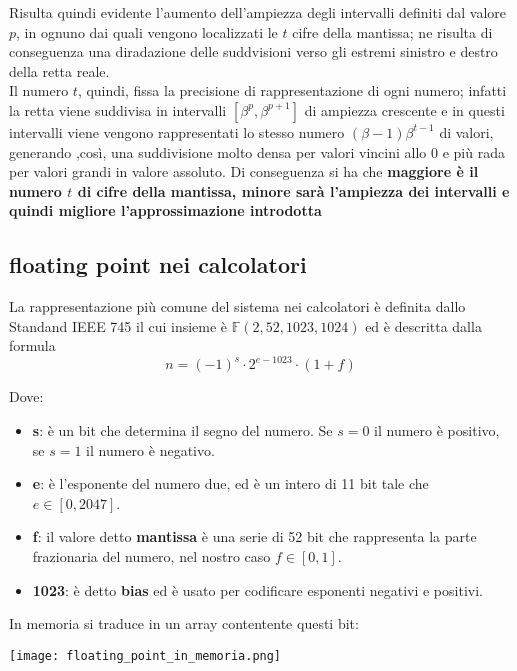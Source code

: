 Risulta quindi evidente l'aumento dell'ampiezza degli intervalli definiti dal valore $p$, in ognuno dai quali vengono localizzati le $t$ cifre della mantissa; ne risulta di conseguenza una diradazione delle suddvisioni verso gli estremi sinistro e destro della retta reale. \\
Il numero $t$, quindi, fissa la precisione di rappresentazione di ogni numero; infatti la retta viene suddivisa in intervalli $[\beta^p,\beta^{p+1}]$  di ampiezza crescente e in questi intervalli viene vengono rappresentati lo stesso numero $(\beta-1)\beta^{t-1}$ di valori, generando ,così, una suddivisione molto densa per valori vincini allo 0 e più rada per valori grandi in valore assoluto. Di conseguenza si ha che \textbf{maggiore è il numero $t$ di cifre della mantissa, minore sarà l'ampiezza dei intervalli e quindi migliore l'approssimazione introdotta}

\subsection{floating point nei calcolatori}
La rappresentazione più comune del sistema nei calcolatori è definita dallo Standand IEEE 745 il cui insieme è $\mathbb{F}(2,52,1023,1024)$ ed è descritta dalla formula
\[
    n = (-1)^s \cdot 2^{e-1023} \cdot (1+f)   
\]

Dove: 
\begin{itemize}
    \item \textbf{s}: è un bit che determina il segno del numero. Se $s=0$ il numero è positivo, se $s=1$ il numero è negativo.
    \item \textbf{e}: è l'esponente del numero due, ed è un intero di 11 bit tale che $e \in [0,2047]$.
    \item \textbf{f}: il valore detto \textbf{mantissa} è una serie di 52 bit che rappresenta la parte frazionaria del numero, nel nostro caso $f \in [0,1]$.
    \item \textbf{1023}: è detto \textbf{bias} ed è usato per codificare esponenti negativi e positivi.
\end{itemize}
In memoria si traduce in un array contentente questi bit:
\begin{center}
    \texttt{[image: floating\_point\_in\_memoria.png]}
\end{center}


